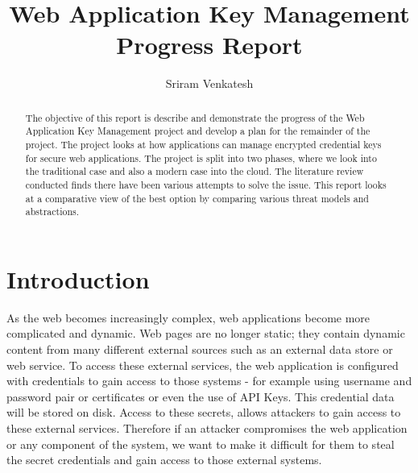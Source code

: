 \documentclass[11pt, a4paper, twoside, notitlepage]{article}
\title{Web Application Key Management Progress Report}
\author{Sriram Venkatesh}
\date{}
\begin{document}
\frontmatter


\begin{abstract}
The objective of this report is describe and demonstrate the progress of the Web Application Key Management project and develop a plan for the remainder of the project. The project looks at how applications can manage encrypted credential keys for secure web applications. The project is split into two phases, where we look into the traditional case and also a modern case into the cloud. The literature review conducted finds there have been various attempts to solve the issue. This report looks at a comparative view of the best option by comparing various threat models and abstractions. 
\end{abstract}


\maketitle




\mainmatter


\section{Introduction}
As the web becomes increasingly complex, web applications become more complicated and dynamic. Web pages are no longer static; they contain dynamic content from many different external sources such as an external data store or web service. To access these external services, the web application is configured with credentials to gain access to those systems - for example using username and password pair or certificates or even the use of API Keys. This credential data will be stored on disk. Access to these secrets, allows attackers to gain access to these external services. Therefore if an attacker compromises the web application or any component of the system, we want to make it difficult for them to steal the secret credentials and gain access to those external systems. \\
\end{document}
